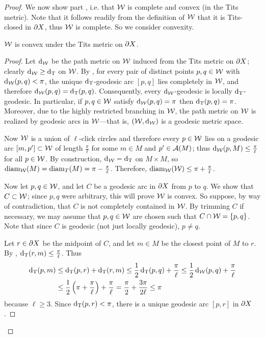 \documentclass{amsart}
\DeclareMathOperator{\dW}{d_{\W}}
\begin{document}
\begin{proof}
We now show part , i.e. that $\mathcal W$ is complete and convex (in the Tits metric).  Note that it follows readily from the definition of $\mathcal W$ that it is Tits-closed in $\partial X$, thus $\mathcal W$ is complete.  So we consider convexity.

\begin{claim}		\label{convexity}
$\mathcal W$ is convex under the Tits metric on $\partial X$. \end{claim}

\begin{proof}
Let $\dW$ be the path metric on $\mathcal W$ induced from the Tits metric on $\partial X$; clearly $\dW \ge \dT$ on $\mathcal W$.
By , for every pair of distinct points $p,q \in \mathcal W$ with $\dW (p,q) < \pi$, the unique $\operatorname{d_T}$-geodesic arc $[p,q]$ lies completely in $\mathcal W$, and therefore $\dW (p,q) = \dT (p,q)$.
Consequently, every $\dW$-geodesic is locally $\operatorname{d_T}$-geodesic.
In particular, if $p,q \in \mathcal W$ satisfy $\dW (p,q) = \pi$ then $\operatorname{d_T} (p,q) = \pi$.
Moreover, due to the highly restricted branching in $\mathcal W$, the path metric on $\mathcal W$ is realized by geodesic arcs in $\mathcal W$---that is, $(\W, \dW)$ is a geodesic metric space.

Now $\mathcal W$ is a union of $\ell$-click circles and therefore every $p \in \mathcal W$ lies on a geodesic arc $[m,p'] \subset \mathcal W$ of length $\frac{\pi}{\ell}$ for some $m \in M$ and $p' \in \operatorname{\mathcal A}(M)$; thus $\dW (p, M) \le \frac{\pi}{\ell}$ for all $p \in \mathcal W$.
By construction, $\dW = \dT$ on $M \times M$, so $\operatorname{diam}_{\mathcal W} (M) = \operatorname{diam}_T (M) = \pi - \frac{\pi}{\ell}$.
Therefore, $\operatorname{diam}_{\mathcal W} (\mathcal W) \le \pi + \frac{\pi}{\ell}$.

Now let $p,q \in \mathcal W$, and let $C$ be a geodesic arc in $\partial X$ from $p$ to $q$.
We show that $C \subset \mathcal W$; since $p,q$ were arbitrary, this will prove $\mathcal W$ is convex.
So suppose, by way of contradiction, that $C$ is not completely contained in $\mathcal W$.
By trimming $C$ if necessary, we may assume that $p,q \in \mathcal W$ are chosen such that $C \cap \mathcal W = \left\{p,q\right\}$.
Note that since $C$ is geodesic (not just locally geodesic), $p \neq q$.

Let $r \in \partial X$ be the midpoint of $C$, and let $m \in M$ be the closest point of $M$ to $r$.
By , $\operatorname{d_T}(r,m) \le \frac{\pi}{\ell}$.
Thus
\begin{align}
\dT(p,m)
&\le \dT(p,r) + \dT(r,m)
\le \frac{1}{2} \dT(p,q) + \frac{\pi}{\ell}
\le \frac{1}{2} \dW(p,q) + \frac{\pi}{\ell} \label{convexity inequality} \\
&\le \frac{1}{2} \left(\pi + \frac{\pi}{\ell} \right) + \frac{\pi}{\ell}
= \frac{\pi}{2} + \frac{3\pi}{2\ell}
\le \pi \nonumber
\end{align}
because $\ell \ge 3$.
Since $\operatorname{d_T}(p,r) < \pi$, there is a unique geodesic arc $[p,r]$ in $\partial X$.


\end{proof}
\end{proof}
\end{document}
